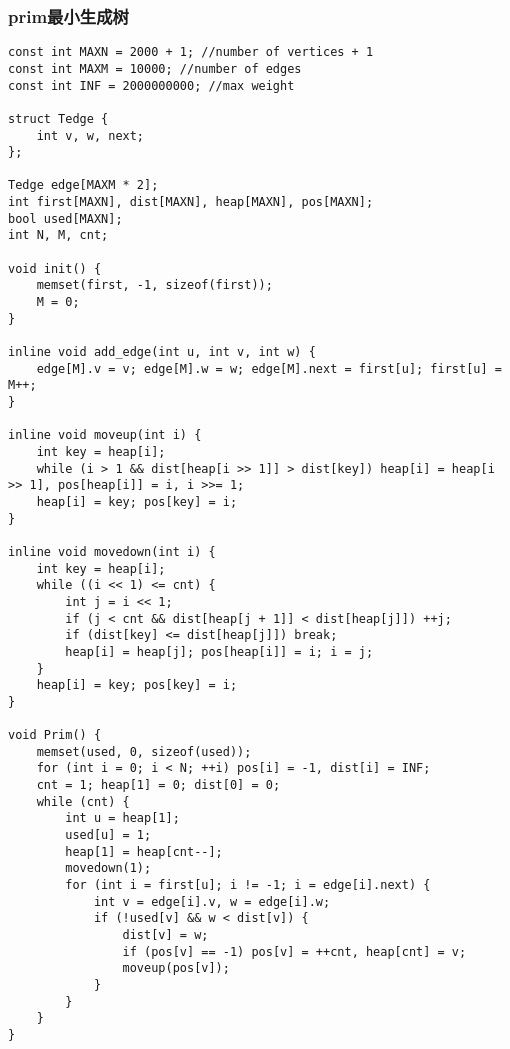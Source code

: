 \subsubsection{prim最小生成树}
\begin{verbatim}
const int MAXN = 2000 + 1; //number of vertices + 1
const int MAXM = 10000; //number of edges
const int INF = 2000000000; //max weight

struct Tedge {
    int v, w, next;
};

Tedge edge[MAXM * 2];
int first[MAXN], dist[MAXN], heap[MAXN], pos[MAXN];
bool used[MAXN];
int N, M, cnt;

void init() {
    memset(first, -1, sizeof(first));
    M = 0;
}

inline void add_edge(int u, int v, int w) {
    edge[M].v = v; edge[M].w = w; edge[M].next = first[u]; first[u] = M++;
}

inline void moveup(int i) {
    int key = heap[i];
    while (i > 1 && dist[heap[i >> 1]] > dist[key]) heap[i] = heap[i >> 1], pos[heap[i]] = i, i >>= 1;
    heap[i] = key; pos[key] = i;
}

inline void movedown(int i) {
    int key = heap[i];
    while ((i << 1) <= cnt) {
        int j = i << 1;
        if (j < cnt && dist[heap[j + 1]] < dist[heap[j]]) ++j;
        if (dist[key] <= dist[heap[j]]) break;
        heap[i] = heap[j]; pos[heap[i]] = i; i = j;
    }
    heap[i] = key; pos[key] = i;
}

void Prim() {
    memset(used, 0, sizeof(used));
    for (int i = 0; i < N; ++i) pos[i] = -1, dist[i] = INF;
    cnt = 1; heap[1] = 0; dist[0] = 0;
    while (cnt) {
        int u = heap[1];
        used[u] = 1;
        heap[1] = heap[cnt--];
        movedown(1);
        for (int i = first[u]; i != -1; i = edge[i].next) {
            int v = edge[i].v, w = edge[i].w;
            if (!used[v] && w < dist[v]) {
                dist[v] = w;
                if (pos[v] == -1) pos[v] = ++cnt, heap[cnt] = v;
                moveup(pos[v]);
            }
        }
    }
}
\end{verbatim}
